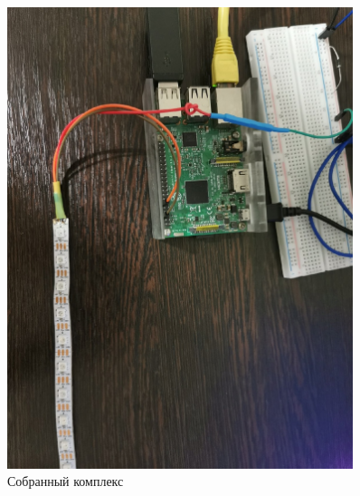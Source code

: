 \begin{figure}[H]
  \centering
  \includegraphics[angle=90, width=0.9\textwidth]{assets/images/practical/Полная схема.jpg}
  \caption{Собранный комплекс}
  \label{img:all__hard}
\end{figure}

